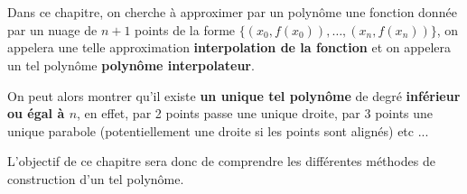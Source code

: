 \chapter*{}
Dans ce chapitre, on cherche à approximer par un polynôme une fonction donnée par un nuage de \(n + 1\) points de la forme \(\{(x_0, f(x_0)), \ldots,(x_n, f(x_n))\}\), on appelera une telle approximation \textbf{interpolation de la fonction} et on appelera un tel polynôme \textbf{polynôme interpolateur}.\<

On peut alors montrer qu'il existe \textbf{un unique tel polynôme} de degré \textbf{inférieur ou égal à \(n\)}, en effet, par 2 points passe une unique droite, par 3 points une unique parabole (potentiellement une droite si les points sont alignés) etc ...\<

L'objectif de ce chapitre sera donc de comprendre les différentes méthodes de construction d'un tel polynôme.

